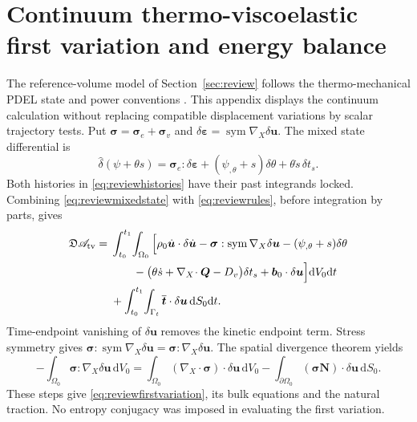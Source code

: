 \documentclass[11pt,a4paper]{article}
\theoremstyle{remark}\newtheorem{remark}{Remark}
\numberwithin{equation}{section}
\newcommand{\dd}{\mathrm{d}}
\newcommand{\grad}{\nabla}
\newcommand{\sym}{\operatorname{sym}}
\begin{document}
\section{Continuum thermo-viscoelastic first variation and energy balance}\label{app:review}
The reference-volume model of Section~\ref{sec:review} follows the thermo-mechanical PDEL state and power conventions \citep{RenEntropy,RenSpending,RenEulerian,RenMultiChannel}. This appendix displays the continuum calculation without replacing compatible displacement variations by scalar trajectory tests. Put $\boldsymbol\sigma=\boldsymbol\sigma_e+\boldsymbol\sigma_v$ and $\delta\boldsymbol\varepsilon=\sym\grad_X\delta\boldsymbol u$. The mixed state differential is
\begin{equation}
\widehat\delta(\psi+\theta s)
=\boldsymbol\sigma_e:\delta\boldsymbol\varepsilon
+(\psi_{,\theta}+s)\delta\theta
+\theta\dot s\,\delta t_s.
\label{eq:reviewmixedstate}
\end{equation}
Both histories in \eqref{eq:reviewhistories} have their past integrands locked. Combining \eqref{eq:reviewmixedstate} with \eqref{eq:reviewrules}, before integration by parts, gives
\begin{equation}
\begin{aligned}
\mathfrak D\mathscr A_{\rm tv}
={}&\int_{t_0}^{t_1}\!\int_{\Omega_0}
\Big[\rho_0\dot{\boldsymbol u}\cdot\delta\dot{\boldsymbol u}
-\boldsymbol\sigma:\sym\grad_X\delta\boldsymbol u
-(\psi_{,\theta}+s)\delta\theta\\
&\qquad-\big(\theta\dot s+\grad_X\!\cdot\boldsymbol Q-D_v\big)\delta t_s
+\boldsymbol b_0\cdot\delta\boldsymbol u\Big]\dd V_0\dd t\\
&+\int_{t_0}^{t_1}\!\int_{\Gamma_t}
\overline{\boldsymbol t}\cdot\delta\boldsymbol u\,\dd S_0\dd t.
\end{aligned}
\label{eq:reviewbeforeIBP}
\end{equation}
Time-endpoint vanishing of $\delta\boldsymbol u$ removes the kinetic endpoint term. Stress symmetry gives $\boldsymbol\sigma:\sym\grad_X\delta\boldsymbol u=\boldsymbol\sigma:\grad_X\delta\boldsymbol u$. The spatial divergence theorem yields
\begin{equation}
-\int_{\Omega_0}\boldsymbol\sigma:\grad_X\delta\boldsymbol u\,\dd V_0
=\int_{\Omega_0}(\grad_X\!\cdot\boldsymbol\sigma)\cdot\delta\boldsymbol u\,\dd V_0
-\int_{\partial\Omega_0}(\boldsymbol\sigma\boldsymbol N)\cdot\delta\boldsymbol u\,\dd S_0.
\label{eq:reviewstressIBP}
\end{equation}
These steps give \eqref{eq:reviewfirstvariation}, its bulk equations and the natural traction. No entropy conjugacy was imposed in evaluating the first variation.
\end{document}
